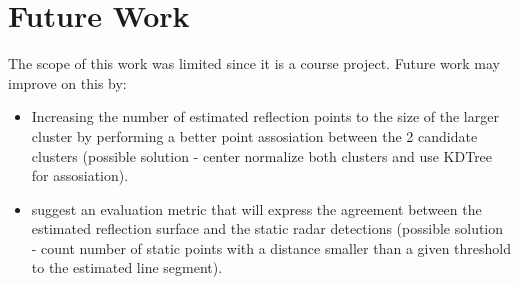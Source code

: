 \documentclass[conference]{IEEEtran}
\begin{document}
\section{Future Work}
The scope of this work was limited since it is a course project. Future work may improve on this by:
\begin{itemize}
    \item Increasing the number of estimated reflection points to the size of the larger cluster by performing a better point assosiation between the 2 candidate clusters (possible solution - center normalize both clusters and use KDTree for assosiation).
    \item suggest an evaluation metric that will express the agreement between the estimated reflection surface and the static radar detections (possible solution - count number of static points with a distance smaller than a given threshold to the estimated line segment).
\end{itemize}

\printbibliography %
\vspace{12pt}
\end{document}
